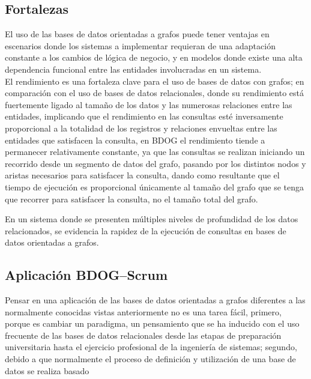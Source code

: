 \documentclass[preprint,12pt]{elsarticle}
\begin{document}
\subsection{\textbf{Fortalezas}}
El uso de las bases de datos orientadas a grafos puede tener ventajas en escenarios donde los sistemas a implementar requieran de una adaptación constante a los cambios de lógica de negocio, y en modelos donde existe una alta dependencia funcional entre las entidades involucradas en un sistema. \\

El rendimiento es una fortaleza clave para el uso de bases de datos con grafos; en comparación con el uso de bases de datos relacionales, donde su rendimiento está fuertemente ligado al tamaño de los datos y las numerosas relaciones entre las entidades, implicando que el rendimiento en las consultas esté inversamente proporcional a la totalidad de los registros y relaciones envueltas entre las entidades que satisfacen la consulta, en BDOG el rendimiento tiende a permanecer  relativamente constante, ya que las consultas se realizan iniciando un recorrido desde un segmento de datos del grafo, pasando por los distintos nodos y aristas necesarios para satisfacer la consulta, dando como resultante que el tiempo de ejecución es proporcional únicamente al tamaño del grafo que se tenga que recorrer para satisfacer la consulta, no el tamaño total del grafo.

En un sistema donde se presenten múltiples niveles de profundidad de los datos relacionados, se evidencia la rapidez de la ejecución de consultas en bases de datos orientadas a grafos. \\

\subsection{\textbf{Aplicación BDOG–Scrum}}
Pensar en una aplicación de las bases de datos orientadas a grafos diferentes a las normalmente conocidas vistas anteriormente no es una tarea fácil, primero, porque es cambiar un paradigma, un pensamiento que se ha inducido con el uso frecuente de las bases de datos relacionales desde las etapas de preparación universitaria hasta el ejercicio profesional de la ingeniería de sistemas; segundo, debido a que normalmente el proceso de definición y utilización de una base de datos se realiza basado\\
\end{document}
